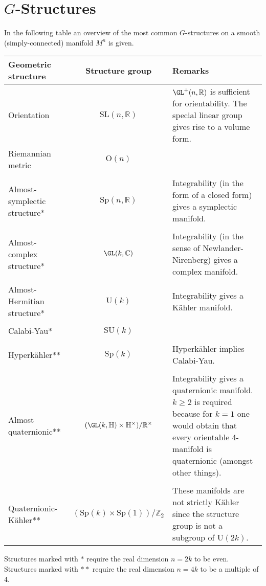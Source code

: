 \chapter{\texorpdfstring{$G$-Structures}{G-Structures}}
    \setcounter{section}{1}

    In the following table an overview of the most common $G$-structures on a smooth (simply-connected) manifold $M^n$ is given.
    \begin{center}
        \begin{tabularx}{\textwidth}{|l|c|X|}
             \hline
                 Geometric structure&Structure group&Remarks\\
             \hline
                 Orientation&$\mathrm{SL}(n,\mathbb{R})$&$\GL^+(n,\mathbb{R})$ is sufficient for orientability. The special linear group gives rise to a volume form.\\
                 Riemannian metric&$\mathrm{O}(n)$&\\&&\\
                 Almost-symplectic structure*&$\mathrm{Sp}(n,\mathbb{R})$&Integrability (in the form of a closed form) gives a symplectic manifold.\\&&\\
                 Almost-complex structure*&$\GL(k,\mathbb{C})$&Integrability (in the sense of Newlander-Nirenberg) gives a complex manifold.\\&&\\
                 Almost-Hermitian structure*&$\mathrm{U}(k)$&Integrability gives a K\"ahler manifold.\\&&\\
                 Calabi-Yau*&$\mathrm{SU}(k)$&\\&&\\
                 Hyperk\"ahler**&$\mathrm{Sp}(k)$&Hyperk\"ahler implies Calabi-Yau.\\&&\\
                 Almost quaternionic**&$(\GL(k,\mathbb{H})\times\mathbb{H}^\times)/\mathbb{R}^\times$&Integrability gives a quaternionic manifold. $k\geq2$ is required because for $k=1$ one would obtain that every orientable 4-manifold is quaternionic (amongst other things).\\&&\\
                 Quaternionic-K\"ahler**&$(\mathrm{Sp}(k)\times\mathrm{Sp}(1))/\mathbb{Z}_2$&These manifolds are not strictly K\"ahler since the structure group is not a subgroup of $\mathrm{U}(2k)$.\\
             \hline
        \end{tabularx}
    \end{center}
    Structures marked with $\ast$ require the real dimension $n=2k$ to be even. Structures marked with $\ast\ast$ require the real dimension $n=4k$ to be a multiple of 4.

